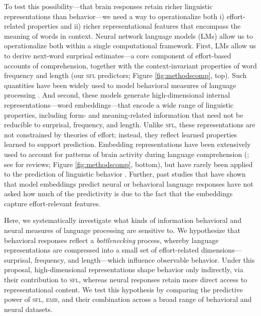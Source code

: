 \documentclass[11pt]{article}
\begin{document}
To test this possibility---that brain responses retain richer linguistic representations than behavior---we need a way to operationalize both i) effort-related properties and ii) richer representational features that encompass the meaning of words in context. Neural network language models (LMs) allow us to operationalize both within a single computational framework. First, LMs allow us to derive next-word surprisal estimates---a core component of effort-based accounts of comprehension, together with the context-invariant properties of word frequency and length (our \textsc{sfl} predictors; Figure \ref{fig:methodscomp}, top). Such quantities have been widely used to model behavioral measures of language processing \citep{demberg2008data, perplexity, frank2019interaction, wilcox2020predictive, kuribayashi2021lower, recurrence_or_attention, oh2022does, berzak2022eye, boyce2023maze, shain_log, de2024locally}. And second, these models generate high-dimensional internal representations---word embeddings---that encode a wide range of linguistic properties, including form- and meaning-related information \citep{jawahar} that need not be reducible to surprisal, frequency, and length. Unlike \textsc{sfl}, these representations are not constrained by theories of effort; instead, they reflect learned properties learned to support prediction. Embedding representations have been extensively used to account for patterns of brain activity during language comprehension (\citealp{jain2018incorporating, gauthier2018does, gauthier2019linking, sun2019towards, schrimpf2021neural, aw2022training, oota2022joint, caucheteux2022brains, goldstein2022brain, antonello2023scaling, tang2023semantic, tuckute2023driving, de2025multilingual}; see \citealp{arana2023deep, tuckutereview} for reviews; Figure \ref{fig:methodscomp}, bottom), but have rarely been applied to the prediction of linguistic behavior \citep[but see][]{schrimpf2021neural, hollenstein-etal-2022-cmcl, lin2025vectors}. Further, past studies that have shown that model embeddings predict neural or behavioral language responses have not asked how much of the predictivity is due to the fact that the embeddings capture effort-relevant features.



\smallskip

Here, we systematically investigate what kinds of information behavioral and neural measures of language processing are sensitive to. We hypothesize that behavioral responses reflect a \textit{bottlenecking} process, whereby language representations are compressed into a small set of effort-related dimensions---surprisal, frequency, and length---which influence observable behavior. Under this proposal, high-dimensional representations shape behavior only indirectly, via their contribution to \textsc{sfl}, whereas neural responses retain more direct access to representational content. We test this hypothesis by comparing the predictive power of \textsc{sfl}, \textsc{emb}, and their combination across a broad range of behavioral and neural datasets. \\
\end{document}

